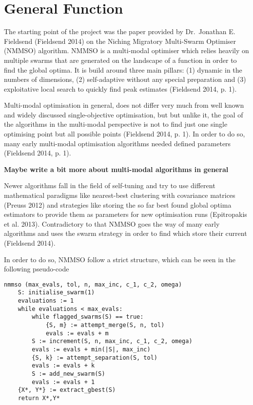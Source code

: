 \documentclass[12pt,a4paper]{article}
\begin{document}
\section{General Function}\label{general-function}

The starting point of the project was the paper provided by Dr.~Jonathan
E. Fieldsend (Fieldsend 2014) on the Niching Migratory Multi-Swarm
Optimiser (NMMSO) algorithm. NMMSO is a multi-modal optimiser which
relies heavily on multiple swarms that are generated on the landscape of
a function in order to find the global optima. It is build around three
main pillars: (1) dynamic in the numbers of dimensions, (2)
self-adaptive without any special preparation and (3) exploitative local
search to quickly find peak estimates (Fieldsend 2014, p. 1).

Multi-modal optimisation in general, does not differ very much from well
known and widely discussed single-objective optimisation, but but unlike
it, the goal of the algorithms in the multi-modal perspective is not to
find just one single optimising point but all possible points (Fieldsend
2014, p. 1). In order to do so, many early multi-modal optimisation
algorithms needed defined parameters (Fieldsend 2014, p. 1).

\textbf{Maybe write a bit more about multi-modal algorithms in general}

Newer algorithms fall in the field of self-tuning and try to use
different mathematical paradigms like nearest-best clustering with
covariance matrices (Preuss 2012) and strategies like storing the so far
best found global optima estimators to provide them as parameters for
new optimisation runs (Epitropakis et al. 2013). Contradictory to that
NMMSO goes the way of many early algorithms and uses the swarm strategy
in order to find which store their current (Fieldsend 2014).

In order to do so, NMMSO follow a strict structure, which can be seen in
the following pseudo-code

\begin{verbatim}
nmmso (max_evals, tol, n, max_inc, c_1, c_2, omega)
    S: initialise_swarm(1)
    evaluations := 1
    while evaluations < max_evals:
        while flagged_swarms(S) == true:
            {S, m} := attempt_merge(S, n, tol)
            evals := evals + m
        S := increment(S, n, max_inc, c_1, c_2, omega)
        evals := evals + min(|S|, max_inc)
        {S, k} := attempt_separation(S, tol)
        evals := evals + k
        S := add_new_swarm(S)
        evals := evals + 1
    {X*, Y*} := extract_gbest(S)
    return X*,Y*
\end{verbatim}
\end{document}

